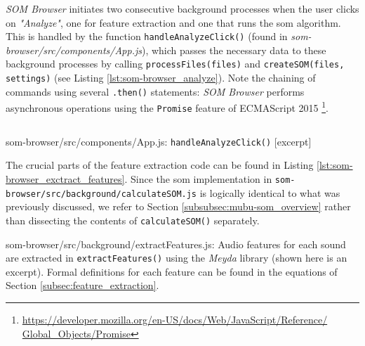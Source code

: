 \smallskip

\textit{SOM Browser} initiates two consecutive background processes when the
user clicks on \textit{"Analyze"}, one for feature extraction and one that runs
the \gls{som} algorithm. This is handled by the function
\texttt{handleAnalyzeClick()} (found in
\textit{som-browser/src/components/App.js}), which passes the necessary data to
these background processes by calling \texttt{processFiles(files)} and
\texttt{createSOM(files, settings)} (see Listing
\ref{lst:som-browser_analyze}). Note the chaining of commands using several
\texttt{.then()} statements: \textit{SOM Browser} performs asynchronous
operations using the \texttt{Promise} feature of ECMAScript 2015
\footnote{\href{https://developer.mozilla.org/en-US/docs/Web/JavaScript/Reference/Global\_Objects/Promise}
{https://developer.mozilla.org/en-US/docs/Web/JavaScript/Reference/ \\
Global\_Objects/Promise}}.

\begin{listing}[!htb]
  \begin{mdframed}
    \inputminted[breaklines, numbers=left, firstline=284, lastline=293,
    fontsize=\footnotesize]{jsx}{../dev/som-browser/src/components/App.js}
  \end{mdframed}
  \caption{som-browser/src/components/App.js:
  \texttt{handleAnalyzeClick()} [excerpt]}
  \label{lst:som-browser_analyze}
\end{listing}

\smallskip

The crucial parts of the feature extraction code can be found in Listing
\ref{lst:som-browser_exctract_features}. Since the \gls{som} implementation in
\texttt{som-browser/src/background/calculateSOM.js} is logically identical to
what was previously discussed, we refer to Section
\ref{subsubsec:mubu-som_overview} rather than dissecting the contents of
\texttt{calculateSOM()} separately.

\begin{listing}[!htb]
  \caption[som-browser/src/background/extractFeatures.js: Audio feature
  extraction]
  {som-browser/src/background/extractFeatures.js: Audio features for
  each sound are extracted in \texttt{extractFeatures()} using the
  \textit{Meyda} library (shown here is an excerpt). Formal definitions for each
  feature can be found in the equations of Section
  \ref{subsec:feature_extraction}.}
  \label{lst:som-browser_exctract_features}
\end{listing}

